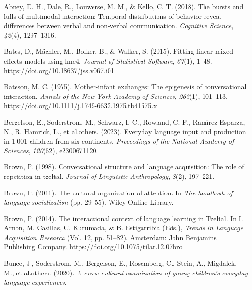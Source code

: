 \documentclass[
  man]{apa6}
\newlength{\cslhangindent}
\newlength{\cslentryspacingunit} %
\newenvironment{CSLReferences}[2] %
 {%
  \setlength{\parindent}{0pt}
  \ifodd #1
  \let\oldpar\par
  \def\par{\hangindent=\cslhangindent\oldpar}
  \fi
  \setlength{\parskip}{#2\cslentryspacingunit}
 }%
 {}
\begin{document}
\hypertarget{refs}{}
\begin{CSLReferences}{1}{0}
\leavevmode{}%
Abney, D. H., Dale, R., Louwerse, M. M., \& Kello, C. T. (2018). The bursts and lulls of multimodal interaction: Temporal distributions of behavior reveal differences between verbal and non-verbal communication. \emph{Cognitive Science}, \emph{42}(4), 1297--1316.

\leavevmode{}%
Bates, D., Mächler, M., Bolker, B., \& Walker, S. (2015). Fitting linear mixed-effects models using {lme4}. \emph{Journal of Statistical Software}, \emph{67}(1), 1--48. \url{https://doi.org/10.18637/jss.v067.i01}

\leavevmode{}%
Bateson, M. C. (1975). Mother-infant exchanges: {The} epigenesis of conversational interaction. \emph{Annals of the New York Academy of Sciences}, \emph{263}(1), 101--113. \url{https://doi.org/10.1111/j.1749-6632.1975.tb41575.x}

\leavevmode{}%
Bergelson, E., Soderstrom, M., Schwarz, I.-C., Rowland, C. F., Ramı́rez-Esparza, N., R. Hamrick, L., et al.others. (2023). Everyday language input and production in 1,001 children from six continents. \emph{Proceedings of the National Academy of Sciences}, \emph{120}(52), e2300671120.

\leavevmode{}%
Brown, P. (1998). Conversational structure and language acquisition: The role of repetition in tzeltal. \emph{Journal of Linguistic Anthropology}, \emph{8}(2), 197--221.

\leavevmode{}%
Brown, P. (2011). The cultural organization of attention. In \emph{The handbook of language socialization} (pp. 29--55). Wiley Online Library.

\leavevmode{}%
Brown, P. (2014). The interactional context of language learning in {Tzeltal}. In I. Arnon, M. Casillas, C. Kurumada, \& B. Estigarribia (Eds.), \emph{Trends in {Language} {Acquisition} {Research}} (Vol. 12, pp. 51--82). Amsterdam: John Benjamins Publishing Company. \url{https://doi.org/10.1075/tilar.12.07bro}

\leavevmode{}%
Bunce, J., Soderstrom, M., Bergelson, E., Rosemberg, C., Stein, A., Migdalek, M., et al.others. (2020). \emph{A cross-cultural examination of young children's everyday language experiences}.


\end{CSLReferences}
\end{document}
